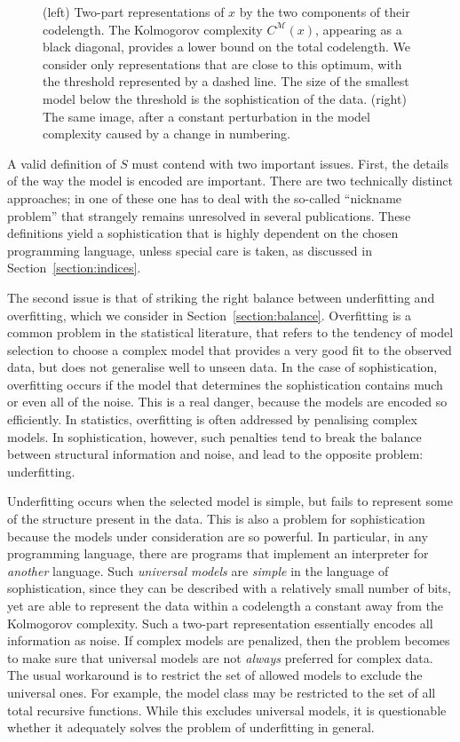\documentclass{style/llncs}
\newcommand{\M}{\mathscr M}
\begin{document}
\begin{figure}[tb]
\begin{minipage}{0.45\textwidth}
  \end{minipage}
  \caption{\small (left) Two-part representations of $x$ by the two components of their codelength. The Kolmogorov complexity $C^\M(x)$, appearing as a black diagonal, provides a lower bound on the total codelength. We consider only representations that are close to this optimum, with the threshold represented by a dashed line. The size of the smallest model below the threshold is the sophistication of the data. (right) The same image, after a constant perturbation in the model complexity caused by a change in numbering.}
  \label{fig:diagram}
\end{figure}

A valid definition of $S$ must contend with two important issues. First, the details of the way the model is encoded are important. There are two technically distinct approaches; in one of these one has to deal with the so-called ``nickname problem'' that strangely remains unresolved in several publications. These definitions yield a sophistication that is highly dependent on the chosen programming language, unless special care is taken, as discussed in Section~\ref{section:indices}.

The second issue is that of striking the right balance between underfitting and overfitting, which we consider in Section~\ref{section:balance}. Overfitting is a common problem in the statistical literature, that refers to the tendency of model selection to choose a complex model that provides a very good fit to the observed data, but does not generalise well to unseen data. In the case of sophistication, overfitting occurs if the model that determines the sophistication contains much or even all of the noise. This is a real danger, because the models are encoded so efficiently. In statistics, overfitting is often addressed by penalising complex models. In sophistication, however, such penalties tend to break the balance between structural information and noise, and lead to the opposite problem: underfitting.

Underfitting occurs when the selected model is simple, but fails to represent some of the structure present in the data. This is also a problem for sophistication because the models under consideration are so powerful. In particular, in any programming language, there are programs that implement an interpreter for \emph{another} language. Such \emph{universal models} are \emph{simple} in the language of sophistication, since they can be described with a relatively small number of bits, yet are able to represent the data within a codelength a constant away from the Kolmogorov complexity. Such a two-part representation essentially encodes all information as noise. If complex models are penalized, then the problem becomes to make sure that universal models are not \emph{always} preferred for complex data. The usual workaround is to restrict the set of allowed models to exclude the universal ones. For example, the model class may be restricted to the set of all total recursive functions. While this excludes universal models, it is questionable whether it adequately solves the problem of underfitting in general.
\end{document}
